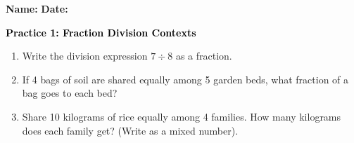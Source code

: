 \documentclass[12pt, letterpaper, fleqn]{article}
\begin{document}
\textbf{Name:} \underline{\hspace{5cm}}
\hfill
\textbf{Date:} \underline{\hspace{3cm}}\\

\begin{tcolorbox}[colback=customteal!20]
    \large\textcolor{black}{\textbf{Practice 1: Fraction Division Contexts}}
\end{tcolorbox}
\begin{enumerate}[itemsep=3.5cm, leftmargin=0.6cm]
\item Write the division expression $7 \div 8$ as a fraction.
\vspace{3.5cm}
\item If 4 bags of soil are shared equally among 5 garden beds, what fraction of a bag goes to each bed?
\vspace{3.5cm}
\item Share 10 kilograms of rice equally among 4 families. How many kilograms does each family get? (Write as a mixed number).
\end{enumerate}
\end{document}
